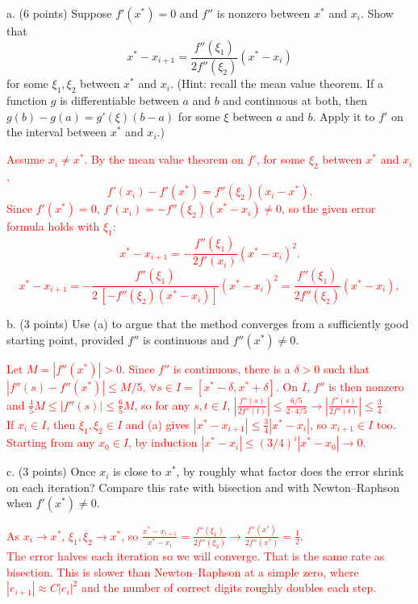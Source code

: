 \documentclass[11pt]{article}
\begin{document}
a. (6 points) Suppose $f'(x^*)=0$ and $f''$ is nonzero between $x^*$ and $x_i$. Show that
\[
x^*-x_{i+1}=\frac{f''(\xi_1)}{2f''(\xi_2)}(x^*-x_i)
\]
for some $\xi_1,\xi_2$ between $x^*$ and $x_i$. (Hint: recall the mean value theorem. If a function $g$ is
differentiable between $a$ and $b$ and continuous at both, then $g(b)-g(a)=g'(\xi)(b-a)$ for some
$\xi$ between $a$ and $b$. Apply it to $f'$ on the interval between $x^*$ and $x_i$.)

\textcolor{red}{
Assume $x_i \ne x^*$. By the mean value theorem on $f'$, for some $\xi_2$ between $x^*$ and $x_i$,
\[
f'(x_i) - f'(x^*) = f''(\xi_2)(x_i - x^*).
\]
Since $f'(x^*) = 0$, $f'(x_i) = -f''(\xi_2)(x^* - x_i) \ne 0$, so the given error formula holds with $\xi_1$:
\[
x^* - x_{i+1} = -\frac{f''(\xi_1)}{2f'(x_i)}(x^* - x_i)^2.
\]
\[
x^* - x_{i+1} = -\frac{f''(\xi_1)}{2\,[-f''(\xi_2)(x^* - x_i)]}(x^* - x_i)^2 = \frac{f''(\xi_1)}{2f''(\xi_2)}(x^* - x_i),
\]
}

b. (3 points) Use (a) to argue that the method converges from a sufficiently good starting
point, provided $f''$ is continuous and $f''(x^*)\ne0$.

\textcolor{red}{
Let $M = |f''(x^*)| > 0$. Since $f''$ is continuous, there is a $\delta > 0$ such that $|f''(s) - f''(x^*)| \le M/5, \, \forall s \in I = [x^* - \delta, x^* + \delta]$. On $I$, $f''$ is then nonzero and $\tfrac45 M \le |f''(s)| \le \tfrac65 M$, so for any $s, t \in I$,
$\left|\frac{f''(s)}{2f''(t)}\right| \le \frac{6/5}{2\cdot 4/5} \rightarrow \left|\frac{f''(s)}{2f''(t)}\right| \le \frac{3}{4}$\\
If $x_i \in I$, then $\xi_1, \xi_2 \in I$ and (a) gives $|x^* - x_{i+1}| \le \tfrac34|x^* - x_i|$, so $x_{i+1} \in I$ too. Starting from any $x_0 \in I$, by induction $|x^* - x_i| \le (3/4)^i|x^* - x_0| \to 0$.
}

c. (3 points) Once $x_i$ is close to $x^*$, by roughly what factor does the error shrink on each
iteration? Compare this rate with bisection and with Newton--Raphson when $f'(x^*)\ne0$.

\textcolor{red}{
As $x_i \to x^*$, $\xi_1, \xi_2 \to x^*$, so
$\frac{x^* - x_{i+1}}{x^* - x_i} = \frac{f''(\xi_1)}{2f''(\xi_2)} \to \frac{f''(x^*)}{2f''(x^*)} = \frac12.$\\
The error halves each iteration so we will converge. That is the same rate as bisection. This is slower than Newton--Raphson at a simple zero, where $|e_{i+1}| \approx C|e_i|^2$ and the number of correct digits roughly doubles each step.
}
\end{document}
